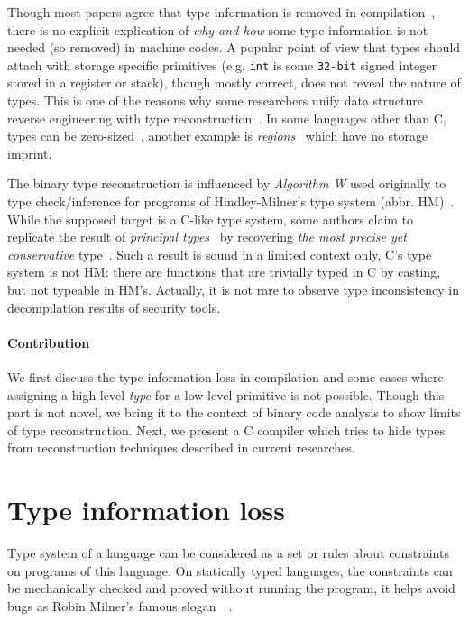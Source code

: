 \documentclass[a4paper]{llncs}
\begin{document}
Though most papers agree that type information is removed in compilation~\cite{lee_tie_2011,caballero_type_2016,lin_automatic_2010},
there is no explicit explication of \emph{why and how} some type information is not needed
(so removed) in machine codes. A popular point of view that types should attach with
storage specific primitives (e.g. \texttt{int} is some \texttt{32-bit} signed integer
stored in a register or stack), though mostly correct, does not reveal the nature of
types. This is one of the reasons why some researchers unify data structure reverse
engineering with type reconstruction~\cite{caballero_type_2016, caballero_polyglot_2007}.
In some languages other than C, types can be zero-sized~\cite{noauthor_phantom_nodate}, another example is
\emph{regions}~\cite{grossman_region-based_2002} which have no storage imprint.

The binary type reconstruction is influenced by \emph{Algorithm W} used originally to
type check/inference for programs of Hindley-Milner's type system (abbr. HM)~\cite{milner_theory_1978,hindley_principal_1969,cardelli_basic_1987}.
While the supposed target is a C-like type system, some authors claim to replicate
the result of \emph{principal types}~\cite{damas_principal_1982,hindley_principal_1969}
by recovering \emph{the most precise yet conservative} type~\cite{lee_tie_2011}.
Such a result is sound in a limited context only, C's type system is not HM: there
are functions that are trivially typed in C by casting, but not typeable in HM's.
Actually, it is not rare to observe type inconsistency in decompilation results
of security tools.

\paragraph{Contribution}
We first discuss the type information loss in compilation and some cases
where assigning a high-level \emph{type} for a low-level primitive
is not possible. Though this part is not novel, we bring it to the context
of binary code analysis to show limits of type reconstruction. Next, we present
a C compiler which tries to hide types from reconstruction techniques described
in current researches.

\section{Type information loss}
Type system of a language can be considered as a set or rules about constraints
on programs of this language. On statically typed languages, the constraints
can be mechanically checked and proved without running the program, it helps
avoid bugs as Robin Milner's famous slogan~~\cite{milner_theory_1978}.
\end{document}
